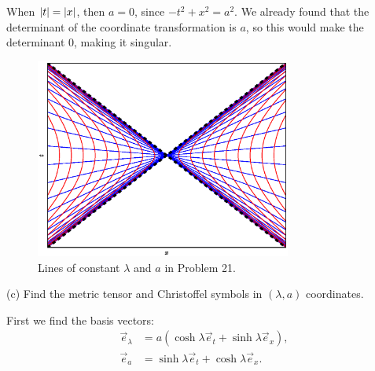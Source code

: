\documentclass[gr-notes.tex]{subfiles}
\begin{document}
When $\abs{t} = \abs{x}$, then $a = 0$, since $-t^2 + x^2 = a^2$. We already found that the determinant of the coordinate transformation is $a$, so this would make the determinant $0$, making it singular.

\begin{figure}[ht]
  \centering
  \includegraphics[width=0.75\textwidth]{img/ch5_problem_21}
  \caption{Lines of constant $\lambda$ and $a$ in Problem 21.}
  \label{fig:ch5-problem-21}
\end{figure}


(c) Find the metric tensor and Christoffel symbols in $(\lambda,a)$ coordinates.

First we find the basis vectors:
%
\begin{align*}
  \vec{e}_\lambda &=
  a (\cosh\lambda \vec{e}_t + \sinh\lambda \vec{e}_x),
  \\
  \vec{e}_a &=
  \sinh\lambda \vec{e}_t + \cosh\lambda \vec{e}_x.
\end{align*}
\end{document}
